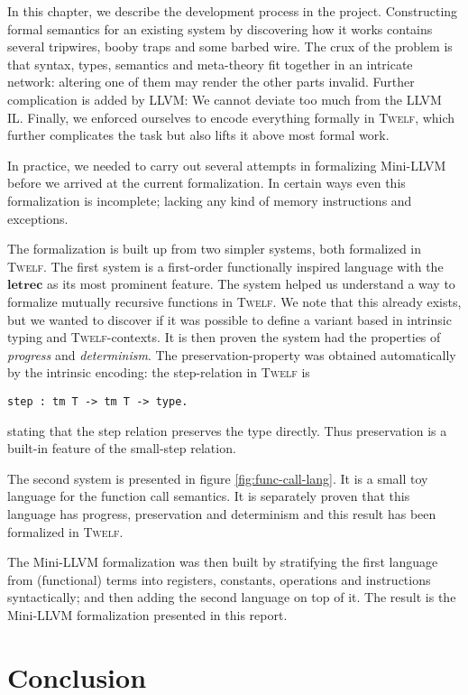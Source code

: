 \documentclass[a4paper, oneside, 10pt, draft]{memoir}
\newcommand{\twelf}{\textsc{Twelf}}
\begin{document}
In this chapter, we describe the development process in the
project. Constructing formal semantics for an existing system by
discovering how it works contains several tripwires, booby traps and
some barbed wire. The crux of the problem is that syntax, types,
semantics and meta-theory fit together in an intricate network:
altering one of them may render the other parts invalid. Further
complication is added by LLVM: We cannot deviate too much from the
LLVM IL. Finally, we enforced ourselves to encode everything formally
in \twelf{}, which further complicates the task but also lifts it
above most formal work.

In practice, we needed to carry out several attempts in formalizing
Mini-LLVM before we arrived at the current formalization. In certain
ways even this formalization is incomplete; lacking any kind of memory
instructions and exceptions.

The formalization is built up from two simpler systems, both
formalized in \twelf{}. The first system is a first-order
functionally inspired language with the $\mathbf{letrec}$ as its most
prominent feature. The system helped us understand a way to formalize
mutually recursive functions in \twelf{}. We note that this already
exists\cite{twelfwiki:2007}, but we wanted to discover if it was
possible to define a variant based in intrinsic typing and
\twelf{}-contexts. It is then proven the system had the properties of
\emph{progress} and \emph{determinism}. The preservation-property was
obtained automatically by the intrinsic encoding: the step-relation in
\twelf{} is
\begin{verbatim}
step : tm T -> tm T -> type.
\end{verbatim}
stating that the step relation preserves the type directly. Thus
preservation is a built-in feature of the small-step relation.

The second system is presented in figure \ref{fig:func-call-lang}. It
is a small toy language for the function call semantics. It is
separately proven that this language has progress, preservation and
determinism and this result has been formalized in \twelf{}.

The Mini-LLVM formalization was then built by stratifying the first
language from (functional) terms into registers, constants, operations
and instructions syntactically; and then adding the second language on
top of it. The result is the Mini-LLVM formalization presented in this
report.

\chapter{Conclusion}
\end{document}
